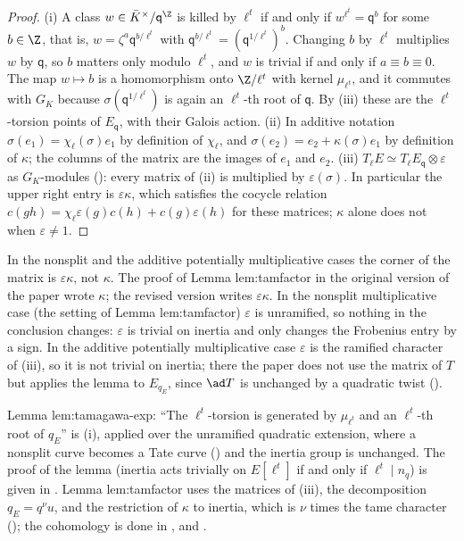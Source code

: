 \begin{proof}
(i) A class $w\in\bar K^\times/\mathsf q^{\Z}$ is killed by $\ell^t$ if and only if $w^{\ell^t}=\mathsf q^b$ for some $b\in\Z$, that is,
$w=\zeta^a\mathsf q^{b/\ell^t}$ with $\mathsf q^{b/\ell^t}=(\mathsf q^{1/\ell^t})^b$. Changing $b$ by $\ell^t$ multiplies $w$ by $\mathsf q$, so $b$ matters only modulo
$\ell^t$, and $w$ is trivial if and only if $a\equiv b\equiv0$. The map $w\mapsto b$ is a homomorphism onto $\Z/\ell^t$ with kernel
$\mu_{\ell^t}$, and it commutes with $G_K$ because $\sigma(\mathsf q^{1/\ell^t})$ is again an $\ell^t$-th root of $\mathsf q$. By
(iii) these are the $\ell^t$-torsion points of $E_{\mathsf q}$, with their Galois action.
(ii) In additive notation $\sigma(e_1)=\chi_\ell(\sigma)e_1$ by definition of $\chi_\ell$, and $\sigma(e_2)=e_2+\kappa(\sigma)e_1$ by definition of
$\kappa$; the columns of the matrix are the images of $e_1$ and $e_2$.
(iii) $T_\ell E\simeq T_\ell E_{\mathsf q}\otimes\varepsilon$ as $G_K$-modules (): every matrix of (ii) is multiplied by
$\varepsilon(\sigma)$. In particular the upper right entry is $\varepsilon\kappa$, which satisfies the cocycle relation
$c(gh)=\chi_\ell\varepsilon(g)c(h)+c(g)\varepsilon(h)$ for these matrices; $\kappa$ alone does not when $\varepsilon\ne1$.
\end{proof}

\begin{warning}\label{warn:reduction:epskappa}
In the nonsplit and the additive potentially multiplicative cases the corner of the matrix is $\varepsilon\kappa$, not $\kappa$. The
proof of Lemma lem:tamfactor in the original version of the paper wrote $\kappa$; the revised version writes $\varepsilon\kappa$. In the nonsplit
multiplicative case (the setting of Lemma lem:tamfactor) $\varepsilon$ is unramified, so nothing in the conclusion changes: $\varepsilon$ is
trivial on inertia and only changes the Frobenius entry by a sign. In the additive potentially multiplicative case $\varepsilon$ is the
ramified character of (iii), so it is not trivial on inertia; there the paper does not
use the matrix of $T$ but applies the lemma to $E_{q_E}$, since $\ad T$ is unchanged by a quadratic twist ().
\end{warning}

\begin{paperlink}
Lemma lem:tamagawa-exp: ``The $\ell^t$-torsion is generated by $\mu_{\ell^t}$ and an $\ell^t$-th root of $q_E$'' is
(i), applied over the unramified quadratic extension, where a nonsplit curve becomes a Tate
curve () and the inertia group is unchanged. The proof of the lemma (inertia acts trivially on
$E[\ell^t]$ if and only if $\ell^t\mid n_q$) is given in . Lemma lem:tamfactor uses the matrices of (iii), the
decomposition $q_E=q^\nu u$, and the restriction of $\kappa$ to inertia, which is $\nu$ times the tame character (); the
cohomology is done in ,  and .
\end{paperlink}

